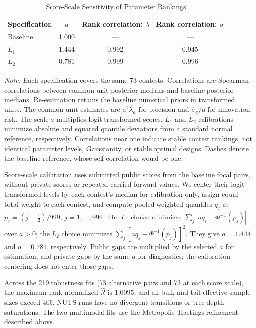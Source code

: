 \documentclass[mnsc]{informs3}
\newcommand{\figtabnotesize}{\TableSpaced\footnotesize}
\begin{document}
\begin{APPENDICES}
\begin{table}[!htbp]
\centering
\caption{Score-Scale Sensitivity of Parameter Rankings}
\label{tab-score-scale-robustness}
\begin{tabularx}{\textwidth}{>{\raggedright\arraybackslash}Xccc}
\toprule
Specification & $a$ & Rank correlation: $\lambda$ & Rank correlation: $\sigma$\\
\midrule
Baseline & 1.000 & --- & ---\\
$L_1$ & 1.444 & 0.992 & 0.945\\
$L_2$ & 0.781 & 0.999 & 0.996\\
\bottomrule
\end{tabularx}
\par\vspace{0.5ex}\noindent
\begin{minipage}{\textwidth}\figtabnotesize
{\footnotesize\textit{Note:} Each specification covers the same 73 contests. Correlations are Spearman correlations between common-unit posterior medians and baseline posterior medians. Re-estimation retains the baseline numerical priors in transformed units.}
{The common-unit estimates are $a^2\hat\lambda_a$ for precision and $\hat\sigma_a/a$ for innovation risk.} {The scale $a$ multiplies logit-transformed scores. $L_1$ and $L_2$ calibrations minimize absolute and squared quantile deviations from a standard normal reference, respectively. Correlations near one indicate stable contest rankings, not identical parameter levels, Gaussianity, or stable optimal designs. Dashes denote the baseline reference, whose self-correlation would be one.}
\end{minipage}
\end{table}

{Score-scale calibration uses submitted public scores from the baseline focal pairs, without private scores or repeated carried-forward values. We center their logit-transformed levels by each contest's median for calibration only, assign equal total weight to each contest, and compute pooled weighted quantiles $q_j$ at $p_j=(j-\tfrac12)/999$, $j=1,\ldots,999$. The $L_1$ choice minimizes $\sum_j|a q_j-\Phi^{-1}(p_j)|$ over $a>0$; the $L_2$ choice minimizes $\sum_j[a q_j-\Phi^{-1}(p_j)]^2$. They give $a=1.444$ and $a=0.781$, respectively. Public gaps are multiplied by the selected $a$ for estimation, and private gaps by the same $a$ for diagnostics; the calibration centering does not enter those gaps.}

Across the 219 robustness fits (73 alternative pairs and 73 at each score scale), the maximum rank-normalized $\widehat R$ is 1.0095, and all bulk and tail effective sample sizes exceed 400. NUTS runs have no divergent transitions or tree-depth saturations. The two multimodal fits use the Metropolis--Hastings refinement described above.


\end{APPENDICES}
\end{document}
